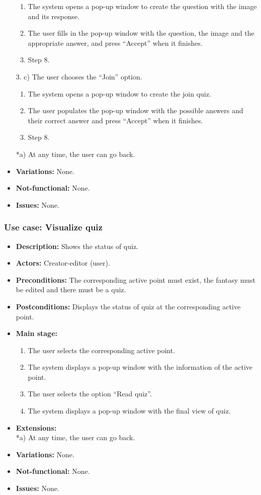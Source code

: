 \begin{itemize}
	\begin{enumerate}
		\item The system opens a pop-up window to create the question with the image and its response.
		\item The user fills in the pop-up window with the question, the image and the appropriate answer, and press ``Accept'' when it finishes.
		\item Step 8.
	\end{enumerate}
	3. c) The user chooses the ``Join'' option.
	\begin{enumerate}
		\item The system opens a pop-up window to create the join quiz.
		\item The user populates the pop-up window with the possible answers and their correct answer and press ``Accept'' when it finishes.
		\item Step 8.
	\end{enumerate}
	*a) At any time, the user can go back.
	\item \textbf{Variations:} None.
	\item \textbf{Not-functional:} None.
	\item \textbf{Issues:} None.
\end{itemize}

\subsubsection{Use case: Visualize quiz}
\begin{itemize}
	\item \textbf{Description:} Shows the status of quiz.
	\item \textbf{Actors:} Creator-editor (user).
	\item \textbf{Preconditions:} The corresponding active point must exist, the fantasy must be edited and there must be a quiz.
	\item \textbf{Postconditions:} Displays the status of quiz at the corresponding active point.
	\item \textbf{Main stage:}
	\begin{enumerate}
		\item The user selects the corresponding active point.
		\item The system displays a pop-up window with the information of the active point.
		\item The user selects the option ``Read quiz''.
		\item The system displays a pop-up window with the final view of quiz.
	\end{enumerate}
	\item \textbf{Extensions:} \\ *a) At any time, the user can go back.
	\item \textbf{Variations:} None.
	\item \textbf{Not-functional:} None.
	\item \textbf{Issues:} None.
\end{itemize}

